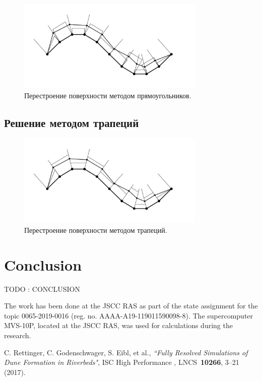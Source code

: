 \documentclass[
11pt,%
tightenlines,%
twoside,%
onecolumn,%
nofloats,%
nobibnotes,%
nofootinbib,%
superscriptaddress,%
noshowpacs,%
centertags]%
{revtex4}
\begin{document}
\begin{figure}[h]
\setcaptionmargin{5mm}
\onelinecaptionstrue
\includegraphics[width=0.8\textwidth]{pics/grid_rectangles.pdf}
\caption{Перестроение поверхности методом прямоугольников.}
\label{fig:grid_rectangles}
\end{figure}

\subsection{Решение методом трапеций}

\begin{figure}[h]
\setcaptionmargin{5mm}
\onelinecaptionstrue
\includegraphics[width=0.8\textwidth]{pics/grid_trapeziums.pdf}
\caption{Перестроение поверхности методом трапеций.}
\label{fig:grid_trapeziums}
\end{figure}

\section{Conclusion}

TODO : CONCLUSION

\begin{acknowledgments}
The work has been done at the JSCC RAS as part of the state assignment for the topic 0065-2019-0016 (reg. no. AAAA-A19-119011590098-8). The supercomputer MVS-10P, located at the JSCC RAS, was used for calculations during the research.
\end{acknowledgments}

\begin{thebibliography}{99}


C. Rettinger, C. Godenschwager, S. Eibl, et al., {\it ``Fully Resolved Simulations of Dune Formation in Riverbeds"}, ISC High Performance , LNCS~{\bf 10266}, 3--21 (2017).

\end{thebibliography}
\end{document}
